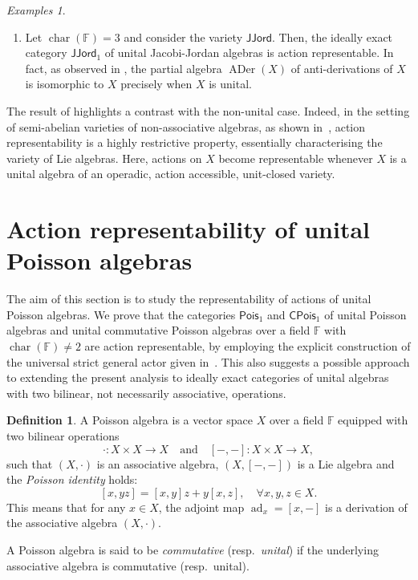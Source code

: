 \documentclass[reqno,a4paper]{amsart}
\theoremstyle{plain}
\theoremstyle{definition}
\newtheorem{definition}[subsection]{Definition}
\theoremstyle{remark}
\newtheorem{examples}[subsection]{Examples}
\numberwithin{equation}{section}
\newcommand{\F}{\mathbb{F}}
\DeclareMathOperator{\bchar}{char}
\DeclareMathOperator{\ADer}{ADer}
\newcommand{\Pois}{\ensuremath{\mathsf{Pois}}}
\newcommand{\CPois}{\ensuremath{\mathsf{CPois}}}
\newcommand{\JJord}{\ensuremath{\mathsf{JJord}}}
\newcommand{\WAlt}{\ensuremath{\mathsf{WAlt}}}
\begin{document}
\begin{examples}{\ }
\begin{enumerate}
Now, by , the ideally exact category $\WAlt_1$ is action representable, and the actor of any algebra $X$ of $\WAlt_1$ is $X$ itself. Consequently, the category of unital alternative algebras in characteristic $2$ is action representable too.

\item Let $\bchar(\F)=3$ and consider the variety $\JJord$. Then, the ideally exact category $\JJord_1$ of unital Jacobi-Jordan algebras is action representable. In fact, as observed in , the partial algebra $\ADer(X)$ of anti-derivations of $X$ is isomorphic to $X$ precisely when $X$ is unital.
\end{enumerate}
\end{examples}

The result of  highlights a contrast with the non-unital case. Indeed, in the setting of semi-abelian varieties of non-associative algebras, as shown in~\cite{Tim}, action representability is a highly restrictive property, essentially characterising the variety of Lie algebras. Here, actions on $X$ become representable whenever $X$ is a unital algebra of an operadic, action accessible, unit-closed variety.

\section{Action representability of unital Poisson algebras}\label{SecPois}

The aim of this section is to study the representability of actions of unital Poisson algebras. We prove that the categories $\Pois_1$ and $\CPois_1$ of unital Poisson algebras and unital commutative Poisson algebras over a field $\F$ with $\bchar(\F) \neq 2$ are action representable, by employing the explicit construction of the universal strict general actor given in~\cite{CigoliManciniMetere}. This also suggests a possible approach to extending the present analysis to ideally exact categories of unital algebras with two bilinear, not necessarily associative, operations.

\begin{definition}
A Poisson algebra is a vector space $X$ over a field $\F$ equipped with two bilinear operations
\[
\cdot \colon X \times X\to X \quad \text{and} \quad [-,-] \colon X \times X  \to X,
\]
such that $(X,\cdot)$ is an associative algebra, $(X,[-,-])$ is a Lie algebra and the \emph{Poisson identity} holds:
\[
[x,yz]=[x,y]z+y[x,z], \quad \forall x,y,z \in X.
\]
This means that for any $x \in X$, the adjoint map $\operatorname{ad}_x=[x,-]$ is a derivation of the associative algebra $(X,\cdot)$.

A Poisson algebra is said to be \emph{commutative} (resp.~\emph{unital}) if the underlying associative algebra is commutative (resp.~unital).
\end{definition}
\end{document}
